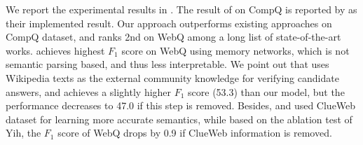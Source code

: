 We report the experimental results in .
The result of \citet{yih2015semantic} on CompQ is reported by \citet{bao2016constraint}
as their implemented result.
Our approach outperforms existing approaches on CompQ dataset,
and ranks 2nd on WebQ among a long list of state-of-the-art works.
\citet{jain2016question} achieves highest $F_1$ score on WebQ using memory networks,
which is not semantic parsing based, and thus less interpretable.
We point out that \citet{xu2016question} uses Wikipedia texts as
the external community knowledge for verifying candidate answers,
and achieves a slightly higher $F_1$ score (53.3) than our model,
but the performance decreases to 47.0 if this step is removed.
Besides, \citet{yih2015semantic} and \citet{bao2016constraint} 
used ClueWeb dataset for learning more accurate semantics,
while based on the ablation test of Yih, 
the $F_1$ score of WebQ drops by 0.9 if ClueWeb information is removed.


